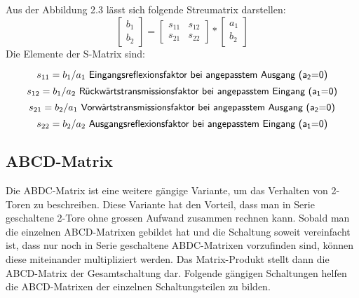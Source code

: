 Aus der Abbildung 2.3 lässt sich folgende Streumatrix darstellen:
\begin{equation}
\left[
\begin{matrix}b_1 \\ b_2 \end{matrix}
\right]
 = \left[\begin{matrix}
s_{11}&s_{12} \\s_{21}&s_{22}
\end{matrix}\right] * \left[\begin{matrix}
a_1\\b_2
\end{matrix}\right]
\end{equation}
Die Elemente der S-Matrix sind:

\begin{equation}\label{equ:def_s11}
	s_{11} = b_1/a_1\textsf{ Eingangsreflexionsfaktor bei angepasstem Ausgang (a\textsubscript{2}=0)}
\end{equation}
\begin{equation}\label{equ:def_s12}
	s_{12} = b_1/a_2\textsf{ Rückwärtstransmissionsfaktor bei angepasstem Eingang (a\textsubscript{1}=0)}
\end{equation}
\begin{equation}\label{equ:def_s21}
	s_{21} = b_2/a_1\textsf{ Vorwärtstransmissionsfaktor bei angepasstem Ausgang (a\textsubscript{2}=0)}
\end{equation}
\begin{equation}\label{equ:def_s22}
	s_{22} = b_2/a_2\textsf{ Ausgangsreflexionsfaktor bei angepasstem Eingang (a\textsubscript{1}=0)}
\end{equation}
\newpage

\subsection{ABCD-Matrix}\label{ABCD-Matrix}
Die ABDC-Matrix ist eine weitere gängige Variante, um das Verhalten von 2-Toren zu beschreiben. Diese Variante hat den Vorteil, dass man in Serie 
geschaltene 2-Tore ohne grossen Aufwand zusammen rechnen kann. Sobald man die einzelnen ABCD-Matrixen gebildet hat und die Schaltung soweit vereinfacht ist, dass nur noch in Serie geschaltene ABDC-Matrixen vorzufinden sind, können diese miteinander multipliziert werden. Das Matrix-Produkt stellt dann die ABCD-Matrix der Gesamtschaltung dar. Folgende gängigen Schaltungen helfen die ABCD-Matrixen der einzelnen Schaltungsteilen zu bilden.


